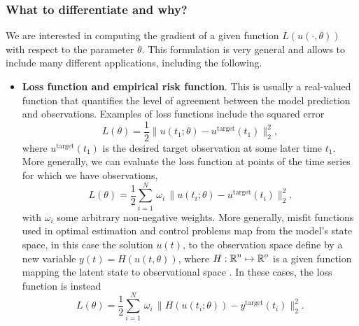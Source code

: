 

\subsubsection{What to differentiate and why?}

We are interested in computing the gradient of a given function $L(u(\cdot, \theta))$ with respect to the parameter $\theta$.
This formulation is very general and allows to include many different applications, including the following. 
\begin{itemize}
    \item \textbf{Loss function and empirical risk function}. This is usually a real-valued function that quantifies the level of agreement between the model prediction and observations. Examples of loss functions include the squared error
    \begin{equation}
         L(\theta) = \frac{1}{2} \| u(t_1; \theta) - u^{\text{target}}(t_1) \|_2^2,
         \label{eq:quadratic-loss-function}
    \end{equation}
    where $u^{\text{target}}(t_1)$ is the desired target observation at some later time $t_1$.
    More generally, we can evaluate the loss function at points of the time series for which we have observations, 
    \begin{equation}
        L(\theta) 
        = 
        \frac{1}{2} \sum_{i=1}^N 
        \, \omega_i \,
        \| u(t_i; \theta) - u^{\text{target}}(t_i) \|_2^2.
    \end{equation}
    with $\omega_i$ some arbitrary non-negative weights.
    More generally, misfit functions used in optimal estimation and control problems map from the model's state space, in this case the solution $u(t)$, to the observation space define by a new variable $y(t) = H(u(t, \theta))$, where $H: \operatorname{\mathbb{R}}^n \mapsto \operatorname{\mathbb{R}}^o$ is a given function mapping the latent state to observational space \cite{1975-Bryson-Ho-optimal-control}. 
    In these cases, the loss function is instead 
    \begin{equation}
        L(\theta) 
        =
        \frac{1}{2} 
        \sum_{i=1}^N
        \, \omega_i \,
        \| H(u(t_i; \theta)) - y^{\text{target}}(t_i) \|_2^2.
        \label{eq:loss-state-observation}

\end{equation}
\end{itemize}
